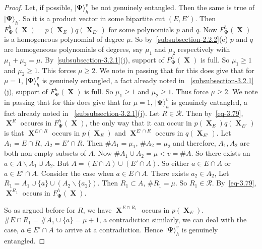 \documentclass[a4paper,12pt]{article}
\DeclareMathOperator{\x}{\mathrm{X}}
\theoremstyle{definition}
\theoremstyle{underlinethm}
\theoremstyle{definition}
\begin{document}
\begin{proof}
Let, if possible, $| \boldsymbol{\Psi} \rangle_{h}^{v}$ be not genuinely entangled. Then the same is true of $|\boldsymbol{\Psi} \rangle_{h}$. So it is a product vector in some bipartite cut $(E, E')$. Then $F_{\boldsymbol{\Psi}}^{h}(\boldsymbol{\x}) = p(\boldsymbol{\x}_{E}) q(\boldsymbol{\x}_{E'})$ for some polynomials $p$ and $q$. Now $F_{\boldsymbol{\Psi}}^{h} (\boldsymbol{\x})$ is a homogeneous polynomial of degree $\mu$. So by~\eqref{subsubsection-2.2.2}(e) $p$ and $q$ are homogeneous polynomials of degrees, say $\mu_{1}$ and $\mu_{2}$ respectively with $\mu_{1} + \mu_{2} =\mu$. By~\eqref{subsubsection-3.2.1}(j), support of $F_{\boldsymbol{\Psi}}^{h}(\boldsymbol{\x})$ is full. So $\mu_{1} \geq 1$ and $\mu_{2}\geq 1$. This forces $\mu \geq 2$. We note in passing that for this does give that for $\mu=1$, $| \boldsymbol{\Psi} \rangle_{h}^{v}$ is genuinely entangled, a fact already noted in ~\eqref{subsubsection-3.2.1}(j), support of $F_{\boldsymbol{\Psi}}^{h}(\boldsymbol{\x})$ is full. So $\mu_{1} \geq 1$ and $\mu_{2}\geq 1$. Thus force $\mu \geq 2$. We note in passing that for this does give that for $\mu =1$, $| \boldsymbol{\Psi} \rangle_{h}^{v}$ is genuinely entangled, a fact already noted in ~\eqref{subsubsection-3.2.1}(j).  Let $R \in \mathcal{R}$. Then by~\eqref{eq-3.79}, $\boldsymbol{\x}^{R}$ occures in $F_{\boldsymbol{\Psi}}^{h}(\boldsymbol{\x})$, the only way that it can occur in $p(\boldsymbol{\x}_{E})$$q(\boldsymbol{\x}_{E'})$ is that $\boldsymbol{\x}^{E \cap R}$ occurs in $p(\boldsymbol{\x}_{E})$ and $\boldsymbol{\x}^{E' \cap R}$ occurs in $q(\boldsymbol{\x}_{E'})$. Let $A_{1}= E \cap R$, $A_{2} = E'\cap R$. Then $\# A_{1}= \mu_{1}$, $\# A_{2}=\mu_{2}$ and therefore, $A_{1}, A_{2}$ are both non-empty subsets of $A$. Now $\# A_{1} \cup A_{2} = \mu < v = \# A$. So there exists an $a \in A \smallsetminus A_{1} \cup A_{2}$. But $A=(E \cap A)\cup (E' \cap A)$. So either $a \in E \cap A$ or $a \in E' \cap A$. Consider the case when $a \in E \cap A$. There exists $a_{2} \in A_{2}$, Let $R_{1} = A_{1} \cup \{a\} \cup (A_{2} \smallsetminus \{a_{2}\})$. Then $R_{1} \subset A$, $\# R_{1} =\mu$. So $R_{1} \in \mathcal{R}$. By~\eqref{eq-3.79}, $\boldsymbol{\x}^{R_{1}}$ occurs in $F_{\boldsymbol{\Psi}}^{h}(\boldsymbol{\x})$.

So as argued before for $R$, we have $\boldsymbol{\x}^{E \cap R_{1}}$ occurs in $p(\boldsymbol{\x}_{E})$. $\# E \cap R_{1} = \# A_{1} \cup \{a\} = \mu + 1$, a contradiction similarly, we can deal with the case, $a \in E' \cap A$ to arrive at a contradiction. Hence $| \boldsymbol{\Psi} \rangle_{h}^{v}$ is genuinely entangled.
\end{proof}
\end{document}
